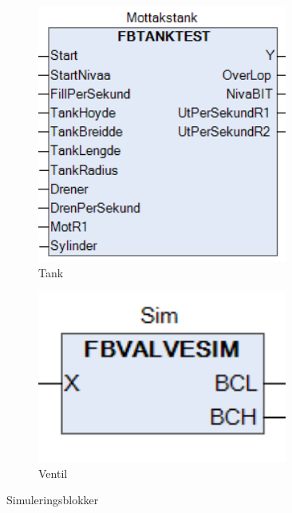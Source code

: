 \begin{figure}[htbp]
    \centering
    \begin{subfigure}[b]{0.3\textwidth}
        \centering
        \includegraphics[width=0.9\textwidth]{Figurar/TankSim.png}
        \caption{Tank}\label{fig:subfig1}
    \end{subfigure}
    \hfill
    \begin{subfigure}[b]{0.3\textwidth}
        \centering
        \includegraphics[width=0.9\textwidth]{Figurar/ValveSim.png}
        \caption{Ventil}\label{fig:subfig2}
    \end{subfigure}
    \caption{Simuleringsblokker}\label{fig:Illustrasjon-Diffuser}
\end{figure}

\newpage
